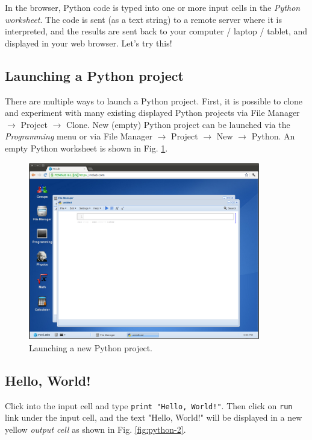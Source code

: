 \documentclass[article,A4,12pt]{llncs}
\begin{document}
In the browser, Python code is typed into one or more input cells in the {\em Python worksheet}. 
The code is sent (as a text string) to a remote server where it is interpreted, and the 
results are sent back to your computer / laptop / tablet, and displayed in your web 
browser.  Let's try this!

\subsection{Launching a Python project}

There are multiple ways to launch a Python project. First, it is 
possible to clone and experiment with many existing displayed Python 
projects via File Manager $\rightarrow$ 
Project $\rightarrow$ Clone. New (empty) Python project can be launched via 
the {\em Programming} menu or via File Manager $\rightarrow$ 
Project $\rightarrow$ New $\rightarrow$ Python. An empty Python worksheet
is shown in Fig. \ref{fig:python}.

\newpage
\begin{figure}[!ht]
\begin{center}
\includegraphics[width=0.9\textwidth]{img/python.png}
\end{center}
\vspace{-2mm}
\caption{Launching a new Python project.}
\label{fig:python}
\end{figure}


\subsection{Hello, World!}

Click into the input cell and type {\tt print "Hello, World!"}.
Then click on {\tt run} link under the input cell, and the text 
"Hello, World!" will be displayed 
in a new yellow {\em output cell} as shown in Fig. \ref{fig:python-2}.
\end{document}
